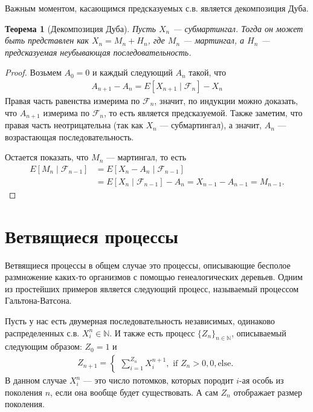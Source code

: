 \documentclass[12pt]{article}
\newcommand\N{\mathbb{N}}
\newcommand\F{\mathcal{F}}
\newtheorem{theorem}{Теорема}
\begin{document}
Важным моментом, касающимся предсказуемых с.в. является декомпозиция Дуба.
\begin{theorem}[Декомпозиция Дуба]
  Пусть $X_n$ --- субмартингал. Тогда он может быть представлен как $X_n = M_n + H_n$, где $M_n$ --- мартингал, а $H_n$ --- предсказуемая неубывающая последовательность.
\end{theorem} 
\begin{proof}
  Возьмем $A_0 = 0$ и каждый следующий $A_n$ такой, что
  \begin{align*}
    A_{n + 1} - A_n = E[X_{n + 1} \mid \F_n] - X_n
  \end{align*}
  Правая часть равенства измерима по $\F_n$, значит, по индукции можно доказать, что $A_{n + 1}$ измерима по $\F_n$, то есть является предсказуемой. Также заметим, что правая часть неотрицательна (так как $X_n$ --- субмартингал), а значит, $A_n$ --- возрастающая последовательность.

  Остается показать, что $M_n$ --- мартингал, то есть
  \begin{align*}
    E[M_n \mid \F_{n - 1}] &= E[X_n - A_n \mid \F_{n - 1}] \\
    &= E[X_n \mid \F_{n -1}] - A_n = X_{n - 1} - A_{n - 1} = M_{n - 1}.
  \end{align*}
\end{proof}

\section{Ветвящиеся процессы}

Ветвящиеся процессы в общем случае это процессы, описывающие бесполое размножение каких-то организмов с помощью генеалогических деревьев. Одним из простейших примеров является следующий процесс, называемый процессом Гальтона-Ватсона.

Пусть у нас есть двумерная последовательность независимых, одинаково распределенных с.в. $X_i^n \in \N$. И также есть процесс $\{Z_n\}_{n \in \N}$, описываемый следующим образом: $Z_0 = 1$ и
\begin{align*}
  Z_{n + 1} = \begin{cases}
    \sum_{i = 1}^{Z_n} X_i^{n + 1}, \text{ if } Z_n > 0,
    0, \text{else}. 
  \end{cases}
\end{align*}
В данном случае $X_i^n$ --- это число потомков, которых породит $i$-ая особь из поколения $n$, если она вообще будет существовать. А сам $Z_n$ отображает размер поколения.
\end{document}
